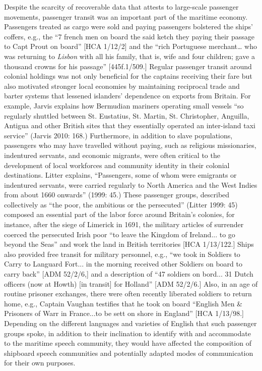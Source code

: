 \begin{styleStandard}
Despite the scarcity of recoverable data that attests to large-scale passenger movements, passenger transit was an important part of the maritime economy. Passengers treated as cargo were sold and paying passengers bolstered the ships’ coffers, e.g., the “7 french men on board the said ketch they paying their passage to Capt Prout on board” [HCA 1/12/2] and the “rich Portuguese merchant… who was returning to \textit{Lisbon} with all his family, that is, wife and four children; gave a thousand crowns for his passage” [445f.1/509.] Regular passenger transit around colonial holdings was not only beneficial for the captains receiving their fare but also motivated stronger local economies by maintaining reciprocal trade and barter systems that lessened islanders’ dependence on exports from Britain. For example, Jarvis explains how Bermudian mariners operating small vessels “so regularly shuttled between St. Eustatius, St. Martin, St. Christopher, Anguilla, Antigua and other British sites that they essentially operated an inter-island taxi service” (Jarvis 2010: 168.) Furthermore, in addition to slave populations, passengers who may have travelled without paying, such as religious missionaries, indentured servants, and economic migrants, were often critical to the development of local workforces and community identity in their colonial destinations. Litter explains, “Passengers, some of whom were emigrants or indentured servants, were carried regularly to North America and the West Indies from about 1660 onwards” (1999: 45.) These passenger groups, described collectively as “the poor, the ambitious or the persecuted” (Litter 1999: 45) composed an essential part of the labor force around Britain's colonies, for instance, after the siege of Limerick in 1691, the military articles of surrender coerced the persecuted Irish poor “to leave the Kingdom of Ireland... to go beyond the Seas” and work the land in British territories [HCA 1/13/122.] Ships also provided free transit for military personnel, e.g., “we took in Soldiers to Carry to Languard Fort... in the morning received other Soldiers on board to carry back” [ADM 52/2/6,] and a description of “47 soldiers on bord... 31 Dutch officers (now at Howth) [in transit] for Holland” [ADM 52/2/6.] Also, in an age of routine prisoner exchanges, there were often recently liberated soldiers to return home, e.g., Captain Vaughan testifies that he took on board “English Men \& Prisoners of Warr in France...to be sett on shore in England” [HCA 1/13/98.] Depending on the different languages and varieties of English that such passenger groups spoke, in addition to their inclination to identify with and accommodate to the maritime speech community, they would have affected the composition of shipboard speech communities and potentially adapted modes of communication for their own purposes. 
\end{styleStandard}

